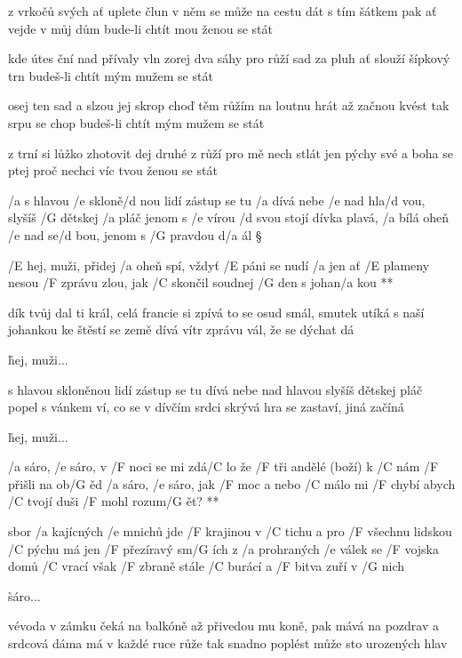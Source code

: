 z vrkočů svých ať uplete člun
v něm se může na cestu dát
s tím šátkem pak ať vejde v můj dům
bude-li chtít mou ženou se stát \s

kde útes ční nad přívaly vln
zorej dva sáhy pro růží sad
za pluh ať slouží šípkový trn
budeš-li chtít mým mužem se stát \s

osej ten sad a slzou jej skrop
choď těm růžím na loutnu hrát
až začnou kvést tak srpu se chop
budeš-li chtít mým mužem se stát \s

z trní si lůžko zhotovit dej
druhé z růží pro mě nech stlát
jen pýchy své a boha se ptej
proč nechci víc tvou ženou se stát




/a s hlavou /e skloně/d nou lidí zástup se tu /a dívá
nebe /e nad hla/d vou, slyšíš /G dětskej /a pláč
jenom s /e vírou /d svou stojí dívka plavá, /a bílá
oheň /e nad se/d bou, jenom s /G pravdou d/a ál \S

\R /E hej, muži, přidej /a oheň spí, vždyť /E páni se nudí /a jen
   ať /E plameny nesou /F zprávu zlou, jak /C skončil
   soudnej /G den
   s johan/a kou **

dík tvůj dal ti král, celá francie si zpívá
to se osud smál, smutek utíká
s naší johankou ke štěstí se země dívá
vítr zprávu vál, že se dýchat dá \s

\r hej, muži...

s hlavou skloněnou lidí zástup se tu dívá
nebe nad hlavou slyšíš dětskej pláč
popel s vánkem ví, co se v dívčím srdci skrývá
hra se zastaví, jiná začíná \s

\r hej, muži...




\R /a sáro, /e sáro, v /F noci se mi zdá/C lo
   že /F tři andělé (boží) k /C nám /F přišli na ob/G ěd
   /a sáro, /e sáro, jak /F moc a nebo /C málo
   mi /F chybí abych /C tvojí duši /F mohl rozum/G ět? **

sbor /a kajícných /e mnichů jde /F krajinou v /C tichu
a pro /F všechnu lidskou /C pýchu má jen /F přezíravý sm/G ích
z /a prohraných /e válek se /F vojska domů /C vrací
však /F zbraně stále /C burácí a /F bitva zuří v /G nich

\r sáro...

vévoda v zámku čeká na balkóně
až přivedou mu koně, pak mává na pozdrav
a srdcová dáma má v každé ruce růže
tak snadno poplést může sto urozených hlav

\rr

